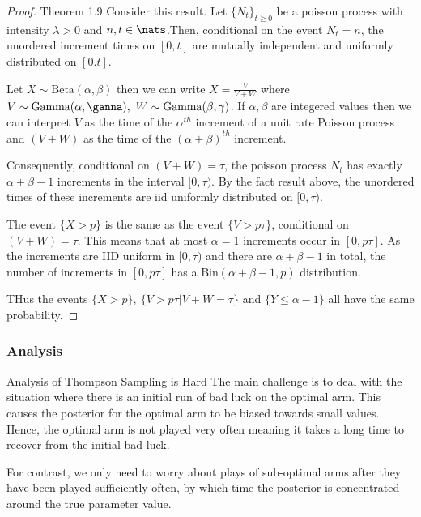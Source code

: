 \documentclass[11pt,a4paper]{article}
\begin{document}
  \begin{proof}{Theorem 1.9}
    Consider this result. Let $\{N_t\}_{t\geq0}$ be a poisson process with intensity $\lambda>0$ and $n,t\in\nats$.Then, conditional on the event $N_t=n$, the unordered increment times on $[0,t]$ are mutually independent and uniformly distributed on $[0.t]$.
    \par Let $X\sim\text{Beta}(\alpha,\beta)$ then we can write $X=\frac{V}{V+W}$ where $V\sim\text{Gamma}(\alpha,\ganna),\ W\sim\text{Gamma}(\beta,\gamma)$. If $\alpha,\beta$ are integered values then we can interpret $V$ as the time of the $\alpha^{th}$ increment of a unit rate Poisson process and $(V+W)$ as the time of the $(\alpha+\beta)^{th}$ increment.
    \par Consequently, conditional on $(V+W)=\tau$, the poisson process $N_t$ has exactly $\alpha+\beta-1$ increments in the interval $[0,\tau)$. By the fact result above, the unordered times of these increments are iid uniformly distributed on $[0,\tau)$.
    \par The event $\{X>p\}$ is the same as the event $\{V>p\tau\}$, conditional on $(V+W)=\tau$. This means that at most $\alpha=1$ increments occur in $[0,p\tau]$. As the increments are IID uniform in $[0,\tau)$ and there are $\alpha+\beta-1$ in total, the number of increments in $[0,p\tau]$  has a $\text{Bin}(\alpha+\beta-1,p)$ distribution.
    \par THus the events $\{X>p\},\ \{V>p\tau|V+W=\tau\}$ and $\{Y\leq\alpha-1\}$ all have the same probability.\hfill\proved
  \end{proof}

\subsubsection{Analysis}

  \begin{remark}{Analysis of Thompson Sampling is Hard}
    The main challenge is to deal with the situation where there is an initial run of bad luck on the optimal arm. This causes the posterior for the optimal arm to be biased towards small values. Hence, the optimal arm is not played very often meaning it takes a long time to recover from the initial bad luck.
    \par For contrast, we only need to worry about plays of sub-optimal arms after they have been played sufficiently often, by which time the posterior is concentrated around the true parameter value.
  \end{remark}
\end{document}

